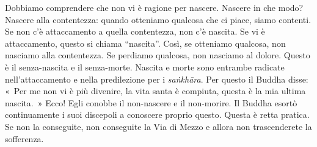 Dobbiamo comprendere che non vi è ragione per nascere. Nascere in che
modo? Nascere alla contentezza: quando otteniamo qualcosa che ci piace,
siamo contenti. Se non c'è attaccamento a quella contentezza, non c'è
nascita. Se vi è attaccamento, questo si chiama ``nascita''. Così, se
otteniamo qualcosa, non nasciamo alla contentezza. Se perdiamo qualcosa,
non nasciamo al dolore. Questo è il senza-nascita e il senza-morte.
Nascita e morte sono entrambe radicate nell'attaccamento e nella
predilezione per i \emph{saṅkhāra}. Per questo il Buddha disse: «~Per me
non vi è più divenire, la vita santa è compiuta, questa è la mia ultima
nascita.~» Ecco! Egli conobbe il non-nascere e il non-morire. Il Buddha
esortò continuamente i suoi discepoli a conoscere proprio questo. Questa
è retta pratica. Se non la conseguite, non conseguite la Via di Mezzo e
allora non trascenderete la sofferenza.